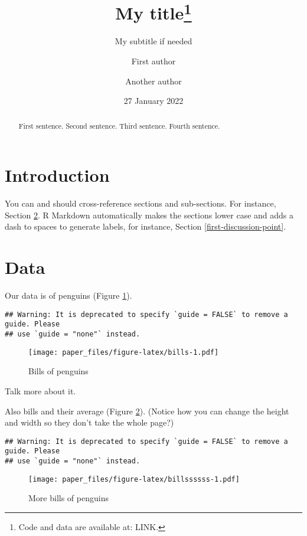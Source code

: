 \documentclass[
]{article}
\title{My title\thanks{Code and data are available at: LINK.}}
\subtitle{My subtitle if needed}
\author{First author \and Another author}
\date{27 January 2022}
\begin{document}
\maketitle
\begin{abstract}
First sentence. Second sentence. Third sentence. Fourth sentence.
\end{abstract}

\hypertarget{introduction}{%
\section{Introduction}\label{introduction}}

You can and should cross-reference sections and sub-sections. For instance, Section \ref{data}. R Markdown automatically makes the sections lower case and adds a dash to spaces to generate labels, for instance, Section \ref{first-discussion-point}.

\hypertarget{data}{%
\section{Data}\label{data}}

Our data is of penguins (Figure \ref{fig:bills}).

\begin{verbatim}
## Warning: It is deprecated to specify `guide = FALSE` to remove a guide. Please
## use `guide = "none"` instead.
\end{verbatim}

\begin{figure}
\centering
\texttt{[image: paper\_files/figure-latex/bills-1.pdf]}
\caption{\label{fig:bills}Bills of penguins}
\end{figure}

Talk more about it.

Also bills and their average (Figure \ref{fig:billssssss}). (Notice how you can change the height and width so they don't take the whole page?)

\begin{verbatim}
## Warning: It is deprecated to specify `guide = FALSE` to remove a guide. Please
## use `guide = "none"` instead.
\end{verbatim}

\begin{figure}
\centering
\texttt{[image: paper\_files/figure-latex/billssssss-1.pdf]}
\caption{\label{fig:billssssss}More bills of penguins}
\end{figure}
\end{document}
